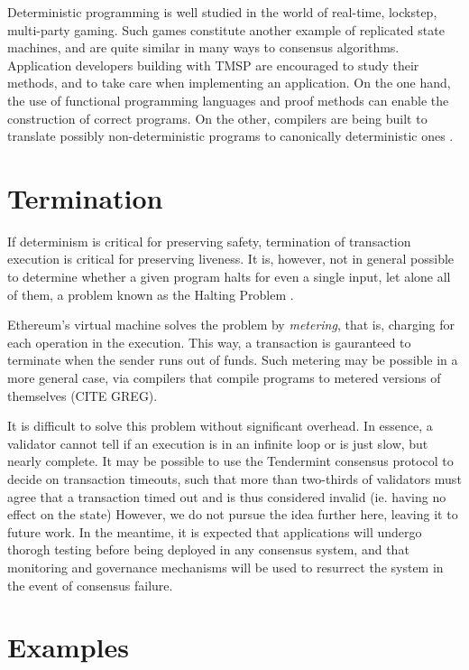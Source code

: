 Deterministic programming is well studied in the world of real-time, lockstep, multi-party gaming.
Such games constitute another example of replicated state machines, and are quite similar in many ways to consensus algorithms.
Application developers building with TMSP are encouraged to study their methods, and to take care when implementing an application.
On the one hand, the use of functional programming languages and proof methods can enable the construction of correct programs.
On the other, compilers are being built to translate possibly non-deterministic programs to canonically deterministic ones \cite{deterministicjs}.

\section{Termination}

If determinism is critical for preserving safety, termination of transaction execution is critical for preserving liveness.
It is, however, not in general possible to determine whether a given program halts for even a single input, let alone all of them,
a problem known as the Halting Problem \cite{halting}.

Ethereum's virtual machine solves the problem by \emph{metering}, that is, charging for each operation in the execution.
This way, a transaction is gauranteed to terminate when the sender runs out of funds.
Such metering may be possible in a more general case, 
via compilers that compile programs to metered versions of themselves \cite{} (CITE GREG).

It is difficult to solve this problem without significant overhead.
In essence, a validator cannot tell if an execution is in an infinite loop or is just slow, but nearly complete.
It may be possible to use the Tendermint consensus protocol to decide on transaction timeouts, 
such that more than two-thirds of validators must agree that a transaction timed out and is thus considered invalid (ie. having no effect on the state)
However, we do not pursue the idea further here, leaving it to future work. 
In the meantime, it is expected that applications will undergo thorogh testing before being deployed in any consensus system,
and that monitoring and governance mechanisms will be used to resurrect the system in the event of consensus failure.

\section{Examples}

